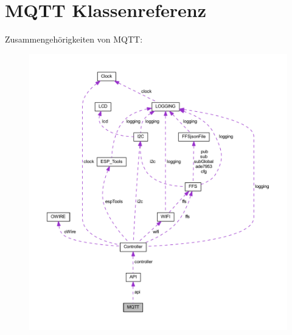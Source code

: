 \hypertarget{class_m_q_t_t}{}\section{M\+Q\+TT Klassenreferenz}
\label{class_m_q_t_t}


Zusammengehörigkeiten von M\+Q\+TT\+:
\nopagebreak
\begin{figure}[H]
\begin{center}
\leavevmode
\includegraphics[width=350pt]{class_m_q_t_t__coll__graph}
\end{center}
\end{figure}
